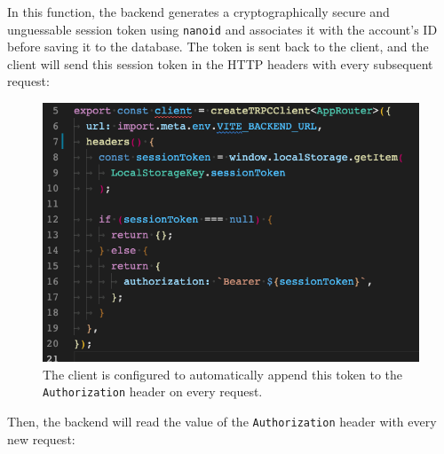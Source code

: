 \documentclass[notitlepage, 12pt]{report}
\newcommand{\code}[1]{\texttt{#1}}
\begin{document}
In this function, the backend generates a cryptographically secure and unguessable  session token using \texttt{nanoid} and associates it with the account's ID before saving it to the database. The token is sent back to the client, and the client will send this session token in the HTTP headers with every subsequent request:

\begin{figure}[H]
	\caption{The client is configured to automatically append this token to the \texttt{Authorization} header on every request.}
	\includegraphics[width=\textwidth]{trpc-headers.png}
\end{figure}

\newpage

Then, the backend will read the value of the \code{Authorization} header with every new request:
\end{document}
